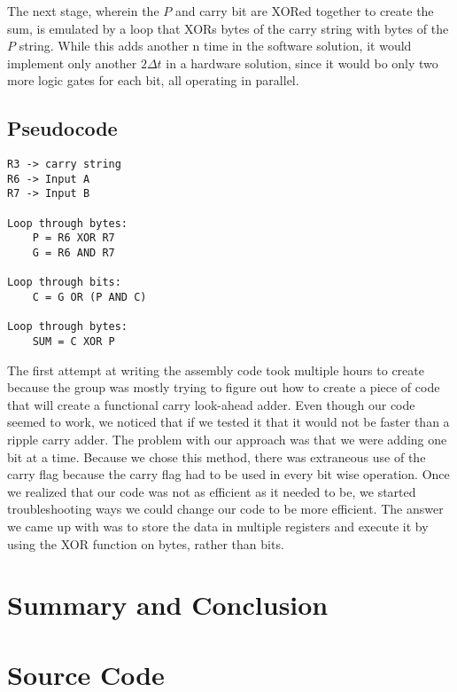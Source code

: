 \documentclass[journal]{IEEEtran}
\begin{document}
The next stage, wherein the $P$ and carry bit are XORed together to create the
sum, is emulated by a loop that XORs bytes of the carry string with bytes of
the $P$ string. While this adds another n time in the software solution, it
would implement only another $2\Delta t$ in a hardware solution, since it would
bo only two more logic gates for each bit, all operating in parallel.

\subsection{Pseudocode}\label{sec:pseudo}
\begin{verbatim}
R3 -> carry string
R6 -> Input A
R7 -> Input B

Loop through bytes:
	P = R6 XOR R7
	G = R6 AND R7

Loop through bits:
	C = G OR (P AND C)

Loop through bytes:
	SUM = C XOR P
\end{verbatim}

The first attempt at writing the assembly code took multiple hours to create
because the group was mostly trying to figure out how to create a piece of
code that will create a functional carry look-ahead adder. Even though our
code seemed to work, we noticed that if we tested it that it would not be
faster than a ripple carry adder. The problem with our approach was that we
were adding one bit at a time. Because we chose this method, there was
extraneous use of the carry flag because the carry flag had to be used in
every bit wise operation. Once we realized that our code was not as efficient
as it needed to be, we started troubleshooting ways we could change our code
to be more efficient. The answer we came up with was to store the data in
multiple registers and execute it by using the XOR function on bytes,
rather than bits.

\section{Summary and Conclusion}

\section{Source Code}\label{sec:code}
\end{document}
